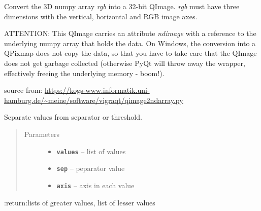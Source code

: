 \documentclass[letterpaper,10pt,english]{sphinxmanual}
\begin{document}

\begin{fulllineitems}
\label{RRtoolbox.lib:RRtoolbox.lib.image.rgb2qi}
Convert the 3D numpy array \emph{rgb} into a 32-bit QImage.  \emph{rgb} must
have three dimensions with the vertical, horizontal and RGB image axes.

ATTENTION: This QImage carries an attribute \emph{ndimage} with a
reference to the underlying numpy array that holds the data. On
Windows, the conversion into a QPixmap does not copy the data, so
that you have to take care that the QImage does not get garbage
collected (otherwise PyQt will throw away the wrapper, effectively
freeing the underlying memory - boom!).

source from: \href{https://kogs-www.informatik.uni-hamburg.de/~meine/software/vigraqt/qimage2ndarray.py}{https://kogs-www.informatik.uni-hamburg.de/\textasciitilde{}meine/software/vigraqt/qimage2ndarray.py}

\end{fulllineitems}


\begin{fulllineitems}
\label{RRtoolbox.lib:RRtoolbox.lib.image.separe}
Separate values from separator or threshold.
\begin{quote}\begin{description}
\item[{Parameters}] \leavevmode\begin{itemize}
\item {} 
\textbf{\texttt{values}} -- list of values

\item {} 
\textbf{\texttt{sep}} -- peparator value

\item {} 
\textbf{\texttt{axis}} -- axis in each value

\end{itemize}

\end{description}\end{quote}

:return:lists of greater values, list of lesser values

\end{fulllineitems}
\end{document}
